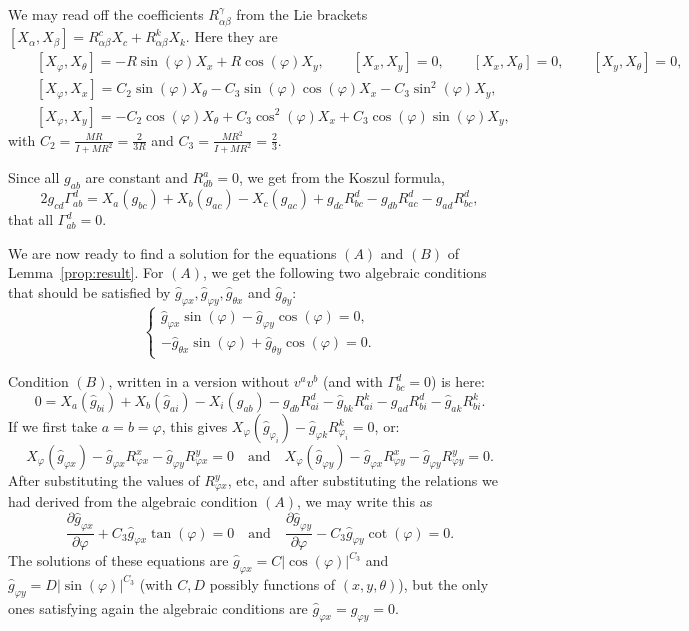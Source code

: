 \documentclass[11pt]{article}
\def\I{I}
\def\m{M}
\def\Ra{R}
\def\ct{C_2}
\def\cd{C_3}
\begin{document}
We may read off the  coefficients $R_{\alpha \beta}^\gamma$ from the Lie brackets $\left[X_\alpha, X_\beta\right]=R_{\alpha \beta}^c X_c+R_{\alpha \beta}^k X_k$. Here they are
\begin{eqnarray*}
&& \left[X_{\varphi}, X_\theta\right]=-\Ra\sin(\varphi) X_x+\Ra\cos(\varphi) X_y,\qquad  \left[X_x, X_y\right]=0, \qquad
\left[X_x, X_\theta\right]=0, \qquad 
\left[X_y, X_\theta\right]=0,
\\ &&
\left[X_{\varphi}, X_x\right]=
\ct \sin(\varphi) X_\theta-\cd \sin(\varphi)\cos(\varphi) X_x-\cd \sin^2(\varphi) X_y 
,\\ && 
\left[X_\varphi, X_y\right] = -\ct \cos(\varphi) X_\theta+\cd \cos^2(\varphi) X_x+\cd \cos(\varphi)\sin(\varphi) X_y,
\end{eqnarray*}
with $\ct=\frac{\m\Ra}{\I +\m\Ra^2}= \frac{2}{3R}$ and $\cd =\frac{\m\Ra^2}{\I +\m\Ra^2} =  \frac{2}{3}$.

Since all $g_{ab}$ are constant and $R^a_{db}=0$, we get from the 
Koszul formula,
\[
2 g_{c d} \Gamma_{a b}^d =  X_a\left(g_{b c}\right)+X_b\left(g_{a c}\right)-X_c\left(g_{a c}\right)+g_{d c} R_{b c}^d
 -g_{d b} R_{a c}^d-g_{a d} R_{b c}^d,
\]
 that all $\Gamma_{a b}^d=0$.

We are now ready to find a solution for the equations $(A)$ and $(B)$ of Lemma~\ref{prop:result}.
For $(A)$, we get
the following two algebraic conditions that should be satisfied by $\hat{g}_{\varphi x},\hat{g}_{\varphi y},\hat{g}_{\theta x}$ and $\hat{g}_{\theta y}$: 
$$ 
\begin{cases}
\hat{g}_{\varphi x} \sin (\varphi)-\hat{g}_{\varphi y} \cos (\varphi)=0, \\
 -\hat{g}_{\theta x} \sin( \varphi)+\hat{g}_{\theta y} \cos (\varphi)=0.  
\end{cases}
$$

Condition $(B)$, written in a version without $v^av^b$  (and with $\Gamma^d_{bc}=0$) is here: {$$
 0=X_a(\hat{g}_{bi}) + X_b(\hat{g}_{ai})-X_i(g_{ab})-g_{db}R^d_{ai} -\hat{g}_{bk} R^k_{ai}-g_{ad}R^d_{bi}  -\hat{g}_{ak} R^k_{bi}.
$$}
If we first take $a=b=\varphi$, this gives $X_{\varphi}\left(\hat{g}_{\varphi_i}\right)-\hat{g}_{\varphi k} R_{\varphi_i}^k=0$, or:
\[
X_{\varphi}\left(\hat{g}_{\varphi x}\right)-\hat{g}_{\varphi x} R_{\varphi x}^x-\hat{g}_{\varphi y} R_{\varphi x}^y=0 \quad\mbox{and}\quad X_{\varphi}\left(\hat{g}_{\varphi y}\right)-\hat{g}_{\varphi x} R_{\varphi y}^x-\hat{g}_{\varphi y} R_{\varphi y}^y=0.
\]
After substituting the values of $R_{\varphi x}^y$, etc, and after substituting the relations we had derived from the algebraic condition  $(A)$, we may write this as
\[
\frac{\partial \hat{g}_{\varphi x}}{\partial \varphi}+\cd \hat{g}_{\varphi x} \tan (\varphi)=0
\quad \mbox{and}\quad \frac{\partial \hat{g}_{\varphi y}}{\partial \varphi}-\cd \hat{g}_{\varphi y} \cot( \varphi)=0. 
\]
The solutions of these equations are $\hat{g}_{\varphi x}=C|\cos (\varphi)|^{\cd}$  and $\hat{g}_{\varphi y}=D |\sin(\varphi)|^{\cd}$ (with $C,D$ possibly functions of $(x,y,\theta)$), but the only ones satisfying again the algebraic conditions are $\hat{g}_{\varphi x}=\hat{g}_{\varphi y}=0$.
\end{document}
